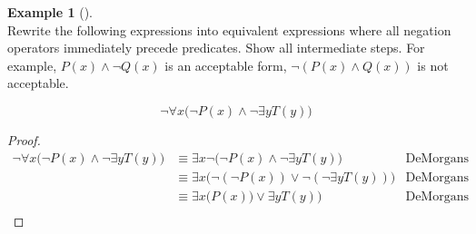 \documentclass[letterpaper,10pt]{article}
\theoremstyle{plain}
\theoremstyle{definition}
\newtheorem{exmp}[thm]{Example}
\theoremstyle{remark}
\providecommand{\land}{\ensuremath{\wedge}}
\providecommand{\lor}{\ensuremath{\vee}}
\begin{document}
\begin{exmp}[]\ \\
Rewrite the following expressions into equivalent expressions where all negation operators immediately precede predicates. Show all intermediate steps. For example, $P(x) \land \lnot Q(x)$ is an acceptable form, $\lnot(P(x) \land Q(x))$ is not acceptable.

    \[\lnot \forall x \bigl( \lnot P(x) \land \lnot \exists y T(y) \bigr)\]
    \vspace{3cm}
\begin{proof}
 \begin{align}
\lnot \forall x \bigl( \lnot P(x) \land \lnot \exists y T(y) \bigr)&\equiv  \exists x \lnot \bigl( \lnot P(x) \land \lnot \exists y T(y) \bigr)&\text{DeMorgans negation of universal quantifier}\\
&\equiv  \exists x  \bigl( \lnot(\lnot P(x)) \lor \lnot(\lnot \exists y T(y) )\bigr)&\text{DeMorgans}\\
&\equiv  \exists x  \bigl( P(x)) \lor \exists y T(y) \bigr)&\text{DeMorgans}\\
 \end{align}
\end{proof}
\end{exmp}
\end{document}
